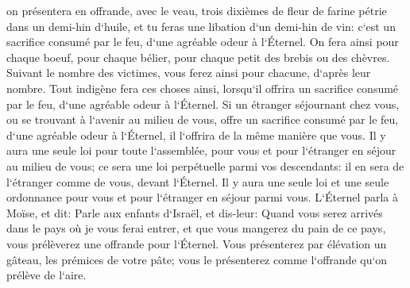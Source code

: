 \verse on présentera en offrande, avec le veau, trois dixièmes de fleur de farine pétrie dans un demi-hin d`huile, 
\verse et tu feras une libation d`un demi-hin de vin: c`est un sacrifice consumé par le feu, d`une agréable odeur à l`Éternel. 
\verse On fera ainsi pour chaque boeuf, pour chaque bélier, pour chaque petit des brebis ou des chèvres. 
\verse Suivant le nombre des victimes, vous ferez ainsi pour chacune, d`après leur nombre. 
\verse Tout indigène fera ces choses ainsi, lorsqu`il offrira un sacrifice consumé par le feu, d`une agréable odeur à l`Éternel. 
\verse Si un étranger séjournant chez vous, ou se trouvant à l`avenir au milieu de vous, offre un sacrifice consumé par le feu, d`une agréable odeur à l`Éternel, il l`offrira de la même manière que vous. 
\verse Il y aura une seule loi pour toute l`assemblée, pour vous et pour l`étranger en séjour au milieu de vous; ce sera une loi perpétuelle parmi vos descendants: il en sera de l`étranger comme de vous, devant l`Éternel. 
\verse Il y aura une seule loi et une seule ordonnance pour vous et pour l`étranger en séjour parmi vous. 
\verse L`Éternel parla à Moïse, et dit: 
\verse Parle aux enfants d`Israël, et dis-leur: Quand vous serez arrivés dans le pays où je vous ferai entrer, 
\verse et que vous mangerez du pain de ce pays, vous prélèverez une offrande pour l`Éternel. 
\verse Vous présenterez par élévation un gâteau, les prémices de votre pâte; vous le présenterez comme l`offrande qu`on prélève de l`aire. 
